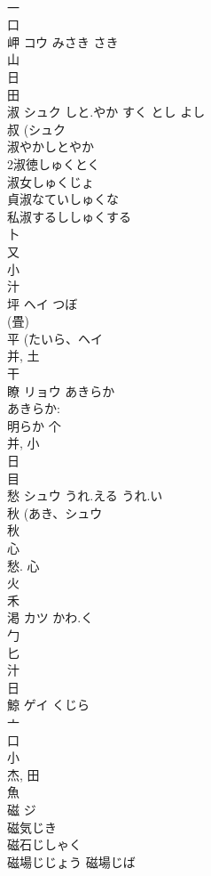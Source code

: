 \documentclass[8pt]{extreport}
\begin{document}
\begin{CJK}{UTF8}{min}
\\	一 
\\	口 
\\	岬	コウ	みさき さき	
\\	山 
\\	日 
\\	田 
\\	淑	シュク	しと.やか すく とし よし	
\\	叔 (シュク 
\\	淑やかしとやか
\\	2淑徳しゅくとく
\\	淑女しゅくじょ
\\	貞淑なていしゅくな
\\	私淑するししゅくする
\\	卜 
\\	又 
\\	小 
\\	汁 
\\	坪	ヘイ	つぼ	
\\	(畳)	
\\	平 (たいら、ヘイ 
\\	并, 土 
\\	干 
\\	瞭	リョウ	あきらか	
\\	あきらか: 
\\	明らか			个 
\\	并, 小 
\\	日 
\\	目 
\\	愁	シュウ	うれ.える うれ.い	
\\	秋 (あき、シュウ 
\\	秋 
\\	心 
\\	愁.			心 
\\	火 
\\	禾 
\\	渇	カツ	かわ.く	
\\	勹 
\\	匕 
\\	汁 
\\	日 
\\	鯨	ゲイ	くじら	
\\	亠 
\\	口 
\\	小 
\\	杰, 田 
\\	魚 
\\	磁	ジ		
\\	磁気じき 
\\	磁石じしゃく 
\\	磁場じじょう 磁場じば 

\end{CJK}
\end{document}
